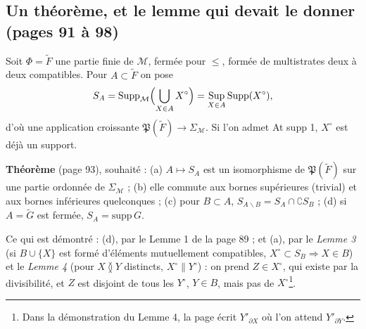 \documentclass[11pt,a4paper]{article}
\begin{document}
\subsection*{Un théorème, et le lemme qui devait le donner (pages 91 à 98)}

Soit $\Phi = \widetilde{F}$ une partie finie de $\mathcal{M}$, fermée pour $\leq$,
formée de multistrates deux à deux compatibles. Pour $A \subset \widetilde{F}$ on
pose
\[
S_{A} = \mathrm{Supp}_{\mathcal{M}}\Bigl(\bigcup_{X \in A} X^{\circ}\Bigr) =
\mathop{\mathrm{Sup}}_{X \in A} \mathrm{Supp}(X^{\circ}) ,
\]
d'où une application croissante $\mathfrak{P}(\widetilde{F}) \to
\Sigma_{\mathcal{M}}$. Si l'on admet At supp 1, $X^{\circ}$ est déjà un support.

\textbf{Théorème} (page 93), souhaité : (a) $A \mapsto S_{A}$ est un isomorphisme
de $\mathfrak{P}(\widetilde{F})$ sur une partie ordonnée de $\Sigma_{\mathcal{M}}$ ;
(b) elle commute aux bornes supérieures (trivial) et aux bornes inférieures
quelconques ; (c) pour $B \subset A$, $S_{A \smallsetminus B} = S_{A} \cap
\complement S_{B}$ ; (d) si $A = \widetilde{G}$ est fermée, $S_{A} =
\mathrm{supp}\, G$.

Ce qui est démontré : (d), par le Lemme 1 de la page 89 ; et (a), par le
\emph{Lemme 3} (si $B \cup \{X\}$ est formé d'éléments mutuellement compatibles,
$X^{\circ} \subset S_{B} \Rightarrow X \in B$) et le \emph{Lemme 4} (pour $X
\between Y$ distincts, $X^{\circ} \parallel Y^{\circ}$) : on prend $Z \in
X^{\circ}$, qui existe par la divisibilité, et $Z$ est disjoint de tous les
$Y^{\circ}$, $Y \in B$, mais pas de $X^{\circ}$\footnote{Dans la démonstration du
Lemme 4, la page écrit $Y'_{\partial X}$ où l'on attend $Y'_{\partial Y}$.}.
\end{document}
